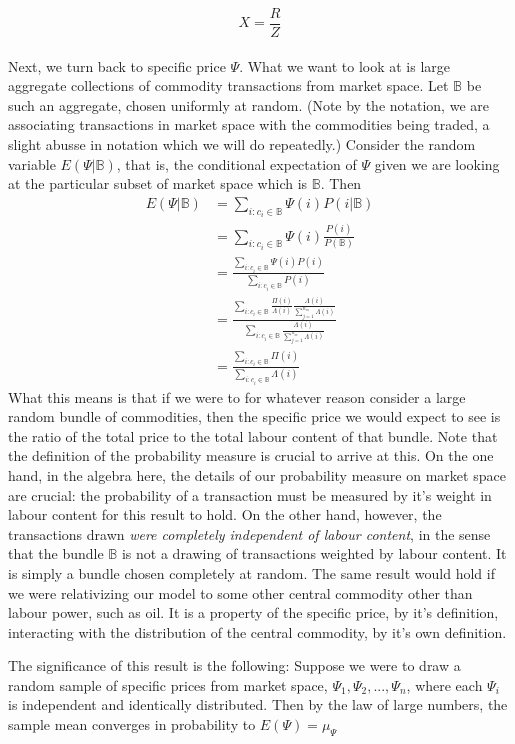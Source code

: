\documentclass{article}
\theoremstyle{definition}
\theoremstyle{plain}
\theoremstyle{theorem}
\begin{document}
\[ X = \frac{R}{Z} \]
\\
Next, we turn back to specific price $\Psi$. What we want to look at is large aggregate collections of commodity transactions from market space. Let $\mathbb{B}$ be such an aggregate, chosen uniformly at random. (Note by the notation, we are associating transactions in market space with the commodities being traded, a slight abusse in notation which we will do repeatedly.) Consider the random variable $E(\Psi|\mathbb{B})$, that is, the conditional expectation of $\Psi$ given we are looking at the particular subset of market space which is $\mathbb{B}$. Then
\begin{align}
	E(\Psi|\mathbb{B}) &= \sum_{i: c_i \in \mathbb{B}}\Psi(i)P(i|\mathbb{B}) \\
						&= \sum_{i: c_i \in \mathbb{B}} \Psi(i)\frac{P(i)}{P(\mathbb{B})} \\
						&=\frac{\sum_{i: c_i \in \mathbb{B}} \Psi(i)P(i)}{\sum_{i: c_i \in \mathbb{B}}P(i)} \\
						&= \frac{\sum_{i: c_i \in \mathbb{B}} \frac{\Pi(i)}{\Lambda(i)}\frac{\Lambda(i)}{\sum_{j = 1}^{n_m}\Lambda(i)}}{\sum_{i: c_i \in \mathbb{B}}\frac{\Lambda(i)}{\sum_{j = 1}^{n_m}\Lambda(i)}} \\
						&= \frac{\sum_{i: c_i \in \mathbb{B}} \Pi(i)}{\sum_{i: c_i \in \mathbb{B}} \Lambda(i)}
\end{align}
What this means is that if we were to for whatever reason consider a large random bundle of commodities, then the specific price we would expect to see is the ratio of the total price to the total labour content of that bundle. Note that the definition of the probability measure is crucial to arrive at this. On the one hand, in the algebra here, the details of our probability measure on market space are crucial: the probability of a transaction must be measured by it's weight in labour content for this result to hold. On the other hand, however, the transactions drawn \textit{were completely independent of labour content}, in the sense that the bundle $\mathbb{B}$ is not a drawing of transactions weighted by labour content. It is simply a bundle chosen completely at random. The same result would hold if we were relativizing our model to some other central commodity other than labour power, such as oil. It is a property of the specific price, by it's definition, interacting with the distribution of the central commodity, by it's own definition. \par 
The significance of this result is the following: Suppose we were to draw a random sample of specific prices from market space, $\Psi_1,\Psi_2,...,\Psi_n$, where each $\Psi_i$ is independent and identically distributed. Then by the law of large numbers, the sample mean converges in probability to $E(\Psi) = \mu_{\Psi}$
\end{document}
